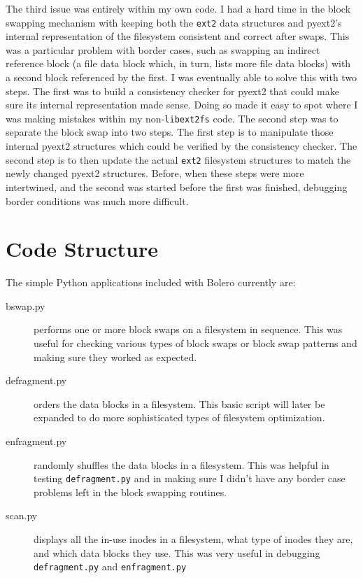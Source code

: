 \documentclass[10pt]{article}
\begin{document}
The third issue was entirely within my own code. I had a hard time in the block swapping mechanism with keeping both the \texttt{ext2} data structures and pyext2's internal representation of the filesystem consistent and correct after swaps. This was a particular problem with border cases, such as swapping an indirect reference block (a file data block which, in turn, lists more file data blocks) with a second block referenced by the first. I was eventually able to solve this with two steps. The first was to build a consistency checker for pyext2 that could make sure its internal representation made sense. Doing so made it easy to spot where I was making mistakes within my non-\texttt{libext2fs} code. The second step was to separate the block swap into two steps. The first step is to manipulate those internal pyext2 structures which could be verified by the consistency checker. The second step is to then update the actual \texttt{ext2} filesystem structures to match the newly changed pyext2 structures. Before, when these steps were more intertwined, and the second was started before the first was finished, debugging border conditions was much more difficult.

\section{Code Structure}

The simple Python applications included with Bolero currently are:
\begin{description}
 \item[bswap.py] performs one or more block swaps on a filesystem in sequence. This was useful for checking various types of block swaps or block swap patterns and making sure they worked as expected.
 \item[defragment.py] orders the data blocks in a filesystem. This basic script will later be expanded to do more sophisticated types of filesystem optimization.
 \item[enfragment.py] randomly shuffles the data blocks in a filesystem. This was helpful in testing \texttt{defragment.py} and in making sure I didn't have any border case problems left in the block swapping routines.
 \item[scan.py] displays all the in-use inodes in a filesystem, what type of inodes they are, and which data blocks they use. This was very useful in debugging \texttt{defragment.py} and \texttt{enfragment.py}
\end{description}
\end{document}

